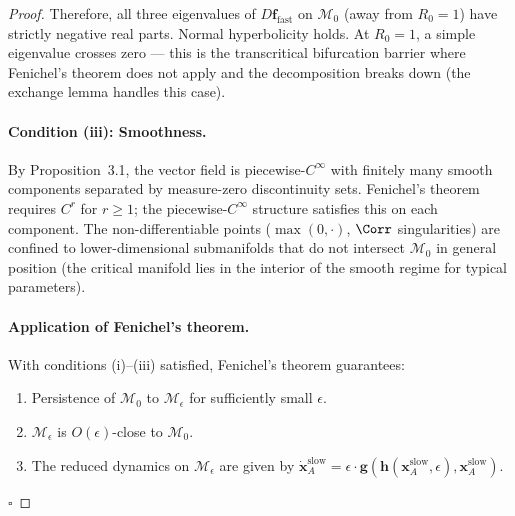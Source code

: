\begin{proof}
Therefore, all three eigenvalues of $D\mathbf{f}_{\text{fast}}$ on
$\mathcal{M}_0$ (away from $R_0 = 1$) have strictly negative real parts.
Normal hyperbolicity holds. At $R_0 = 1$, a simple eigenvalue crosses
zero --- this is the transcritical bifurcation barrier where Fenichel's
theorem does not apply and the decomposition breaks down (the exchange
lemma handles this case).

\paragraph{Condition (iii): Smoothness.}
By Proposition~3.1, the vector field is piecewise-$C^\infty$ with
finitely many smooth components separated by measure-zero discontinuity
sets. Fenichel's theorem requires $C^r$ for $r \geq 1$; the
piecewise-$C^\infty$ structure satisfies this on each component.
The non-differentiable points ($\max(0,\cdot)$, $\Corr$ singularities)
are confined to lower-dimensional submanifolds that do not intersect
$\mathcal{M}_0$ in general position (the critical manifold lies in the
interior of the smooth regime for typical parameters).

\paragraph{Application of Fenichel's theorem.}
With conditions (i)--(iii) satisfied, Fenichel's theorem guarantees:
\begin{enumerate}[nosep]
\item Persistence of $\mathcal{M}_0$ to $\mathcal{M}_\epsilon$ for
  sufficiently small $\epsilon$.
\item $\mathcal{M}_\epsilon$ is $O(\epsilon)$-close to $\mathcal{M}_0$.
\item The reduced dynamics on $\mathcal{M}_\epsilon$ are given by
  $\dot{\mathbf{x}}_A^{\text{slow}} = \epsilon \cdot
  \mathbf{g}(\mathbf{h}(\mathbf{x}_A^{\text{slow}}, \epsilon),
  \mathbf{x}_A^{\text{slow}})$.
\end{enumerate}
$\square$
\end{proof}

